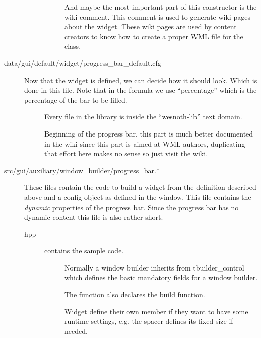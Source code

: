 \begin{description}
\begin{description}
\begin{description}
		And maybe the most important part of this constructor is the wiki
		comment. This comment is used to generate wiki pages about the widget.
		These wiki pages are used by content creators to know how to create a
		proper WML file for the class.
	\end{description}
\end{description}

\item[data/gui/default/widget/progress\_bar\_default.cfg]
	Now that the widget is defined, we can decide how it should look. Which is
	done in this file. Note that in the formula we use ``percentage'' which is
	the percentage of the bar to be filled.

	\begin{description}
	\item[] Every file in the library
		is inside the ``wesnoth-lib'' text domain.

	\item[]
		Beginning of the progress bar, this part is much better documented in
		the wiki %
		since this part is aimed at WML authors, duplicating that effort here
		makes no sense so just visit the wiki.

	\end{description}

\item[src/gui/auxiliary/window\_builder/progress\_bar.*]
	These files contain the code to build a widget from the definition described
	above and a config object as defined in the window. This file contains the
	\emph{dynamic} properties of the progress bar. Since the progress bar has no
	dynamic content this file is also rather short.

\begin{description}
\item[hpp]  contains the sample code. 
	\begin{description}
	\item[] Normally a
		window builder inherits from tbuilder\_control which defines the
		basic mandatory fields for a window builder.

		The function also declares the build function.

		Widget define their own member if they want to have some runtime
		settings, e.g. the spacer defines its fixed size if needed.
	\end{description}


\end{description}
\end{description}
